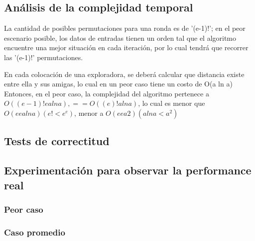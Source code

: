 \subsection{Análisis de la complejidad temporal}
La cantidad de posibles permutaciones para una ronda es de '(e-1)!'; en el peor escenario posible, los datos de entradas tienen un orden tal que el algoritmo encuentre una mejor situación en cada iteración, por lo cual tendrá que recorrer las '(e-1)!' permutaciones. 

En cada colocación de una exploradora, se deberá calcular que distancia existe entre ella y sus amigas, lo cual en un peor caso tiene un costo de O(a ln a)
Entonces, en el peor caso, la complejidad del algoritmo pertenece a $O( (e-1)! e a ln a), == O( (e)! a ln a)$,   lo cual es menor que $O(ee a lna) (e! < e^e)$, menor a  $O(ee a2) (a ln a < a^2)$

\subsection{Tests de correctitud}

\subsection{Experimentación para observar la performance real}

\subsubsection{Peor caso}

\subsubsection{Caso promedio}
